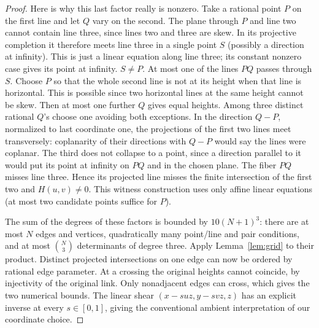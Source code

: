 \begin{proof}
Here is why this last factor really is nonzero. Take a rational point $P$ on the first line and let $Q$ vary on the second. The plane through $P$ and line two cannot contain line three, since lines two and three are skew. In its projective completion it therefore meets line three in a single point $S$ (possibly a direction at infinity). This is just a linear equation along line three; its constant nonzero case gives its point at infinity. $S\ne P$. At most one of the lines $PQ$ passes through $S$. Choose $P$ so that the whole second line is not at its height when that line is horizontal. This is possible since two horizontal lines at the same height cannot be skew. Then at most one further $Q$ gives equal heights. Among three distinct rational $Q$'s choose one avoiding both exceptions. In the direction $Q-P$, normalized to last coordinate one, the projections of the first two lines meet transversely: coplanarity of their directions with $Q-P$ would say the lines were coplanar. The third does not collapse to a point, since a direction parallel to it would put its point at infinity on $PQ$ and in the chosen plane. The fiber $PQ$ misses line three. Hence its projected line misses the finite intersection of the first two and $H(u,v)\ne0$. This witness construction uses only affine linear equations (at most two candidate points suffice for $P$).

The sum of the degrees of these factors is bounded by $10(N+1)^3$: there are at most $N$ edges and vertices, quadratically many point/line and pair conditions, and at most $\binom N3$ determinants of degree three. Apply Lemma~\ref{lem:grid} to their product. Distinct projected intersections on one edge can now be ordered by rational edge parameter. At a crossing the original heights cannot coincide, by injectivity of the original link. Only nonadjacent edges can cross, which gives the two numerical bounds. The linear shear $(x-suz,y-svz,z)$ has an explicit inverse at every $s\in[0,1]$, giving the conventional ambient interpretation of our coordinate choice.
\end{proof}

